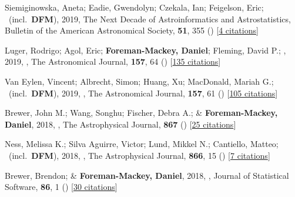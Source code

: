 \item[{\color{numcolor}\scriptsize43}] Siemiginowska, Aneta; Eadie, Gwendolyn; Czekala, Ian; Feigelson, Eric; \etal\ (incl.\ \textbf{DFM}), 2019, The Next Decade of Astroinformatics and Astrostatistics, Bulletin of the American Astronomical Society, \textbf{51}, 355 () [\href{https://ui.adsabs.harvard.edu/abs/2019BAAS...51c.355S}{4 citations}]

\item[{\color{numcolor}\scriptsize42}] Luger, Rodrigo; Agol, Eric; \textbf{Foreman-Mackey, Daniel}; Fleming, David P.; \etal, 2019, , The Astronomical Journal, \textbf{157}, 64 () [\href{https://ui.adsabs.harvard.edu/abs/2019AJ....157...64L}{135 citations}]

\item[{\color{numcolor}\scriptsize41}] Van Eylen, Vincent; Albrecht, Simon; Huang, Xu; MacDonald, Mariah G.; \etal\ (incl.\ \textbf{DFM}), 2019, , The Astronomical Journal, \textbf{157}, 61 () [\href{https://ui.adsabs.harvard.edu/abs/2019AJ....157...61V}{105 citations}]

\item[{\color{numcolor}\scriptsize40}] Brewer, John M.; Wang, Songhu; Fischer, Debra A.; \& \textbf{Foreman-Mackey, Daniel}, 2018, , The Astrophysical Journal, \textbf{867} () [\href{https://ui.adsabs.harvard.edu/abs/2018ApJ...867L...3B}{25 citations}]

\item[{\color{numcolor}\scriptsize39}] Ness, Melissa K.; Silva Aguirre, Victor; Lund, Mikkel N.; Cantiello, Matteo; \etal\ (incl.\ \textbf{DFM}), 2018, , The Astrophysical Journal, \textbf{866}, 15 () [\href{https://ui.adsabs.harvard.edu/abs/2018ApJ...866...15N}{7 citations}]

\item[{\color{numcolor}\scriptsize38}] Brewer, Brendon; \& \textbf{Foreman-Mackey, Daniel}, 2018, , Journal of Statistical Software, \textbf{86}, 1 () [\href{https://scholar.google.com/scholar?cites=789224875040810871}{30 citations}]

